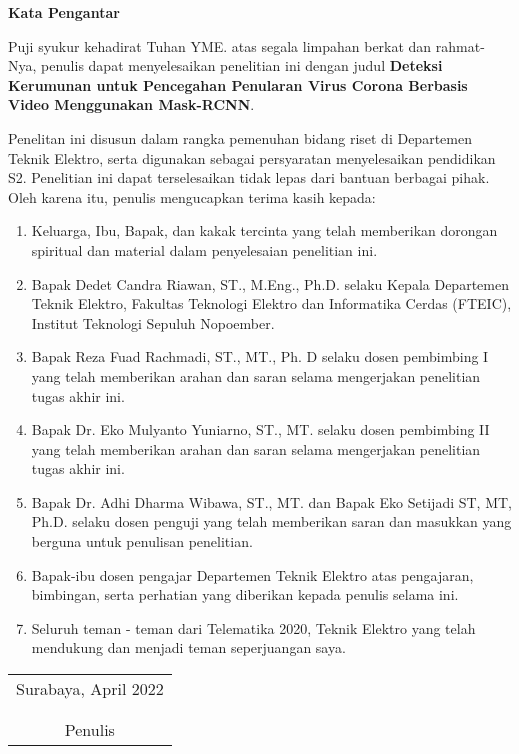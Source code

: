 \begin{center}
\Large\textbf{Kata Pengantar}
\end{center}
\vspace{2ex}
Puji syukur kehadirat Tuhan YME. atas segala limpahan berkat dan rahmat-Nya, penulis dapat menyelesaikan penelitian ini dengan judul \textbf{Deteksi Kerumunan untuk Pencegahan Penularan Virus Corona Berbasis Video Menggunakan Mask-RCNN}.

Penelitan ini disusun dalam rangka pemenuhan bidang riset di Departemen Teknik Elektro, serta digunakan sebagai persyaratan menyelesaikan pendidikan S2. Penelitian ini dapat terselesaikan tidak lepas dari bantuan berbagai pihak. Oleh karena itu, penulis mengucapkan terima kasih kepada:

\begin{enumerate}[nolistsep]
	\item Keluarga, Ibu, Bapak, dan kakak tercinta yang telah memberikan dorongan spiritual dan material dalam penyelesaian penelitian ini.
	\item Bapak Dedet Candra Riawan, ST., M.Eng., Ph.D. selaku Kepala Departemen Teknik Elektro, Fakultas Teknologi Elektro dan Informatika Cerdas (FTEIC), Institut Teknologi Sepuluh Nopoember.
	\item Bapak Reza Fuad Rachmadi, ST., MT., Ph. D selaku dosen pembimbing I yang telah memberikan arahan dan saran selama mengerjakan penelitian tugas akhir ini.
	\item Bapak Dr. Eko Mulyanto Yuniarno, ST., MT. selaku dosen pembimbing II yang telah memberikan arahan dan saran selama mengerjakan penelitian tugas akhir ini.
	\item Bapak Dr. Adhi Dharma Wibawa, ST., MT. dan Bapak Eko Setijadi ST, MT, Ph.D. selaku dosen penguji yang telah memberikan saran dan masukkan yang berguna untuk penulisan penelitian.
	\item Bapak-ibu dosen pengajar Departemen Teknik Elektro atas pengajaran, bimbingan, serta perhatian yang diberikan kepada penulis selama ini.
	\item Seluruh teman - teman dari Telematika 2020, Teknik Elektro yang telah mendukung dan menjadi teman seperjuangan saya.
  
\end{enumerate}

\vspace{26pt}
	\begin{flushright}
		\begin{tabular}[b]{c}
			Surabaya, April 2022
			\\
			\\
			\\
			Penulis
		\end{tabular}
	\end{flushright}
